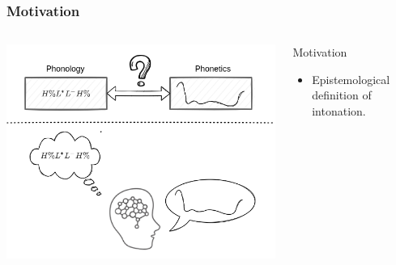 \documentclass[a4paper,9pt]{beamer}
\theoremstyle{mytheoremstyle}
\begin{document}
\begin{frame}
\frametitle{Motivation}
\begin{columns}
\begin{center}
{
\includegraphics[width=\textwidth]{res/head_mapping.png}
}
\end{center}
\pause
\begin{exampleblock}{Motivation}
\begin{itemize}
\item[\checkmark] Epistemological definition of intonation.

\end{itemize}
\end{exampleblock}
\end{columns}
\end{frame}
\end{document}
